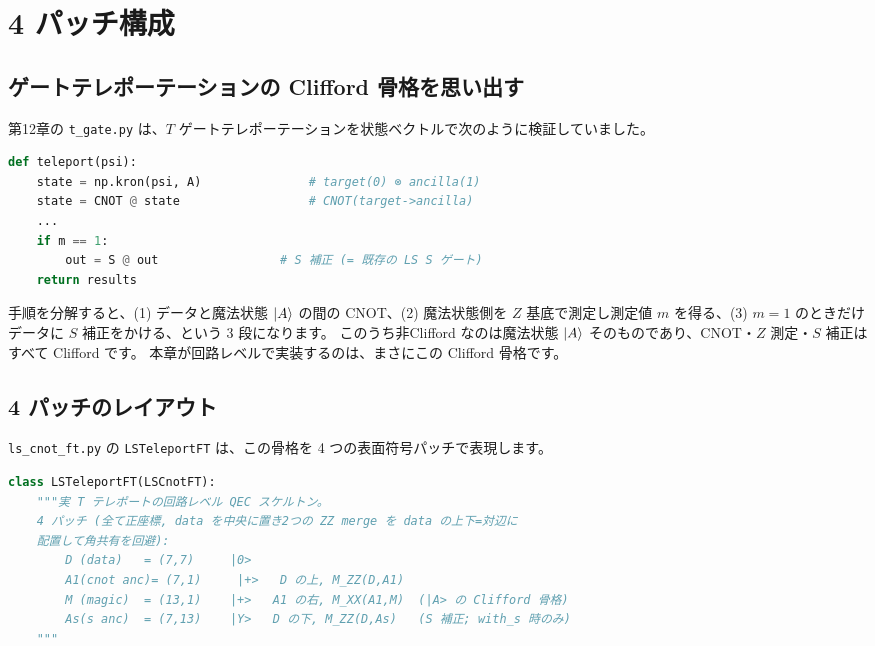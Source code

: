 \section{4 パッチ構成}\label{sec:four_patch}

\subsection{ゲートテレポーテーションの Clifford 骨格を思い出す}

第12章の \texttt{t\_gate.py} は、$T$ ゲートテレポーテーションを状態ベクトルで次のように検証していました。

\begin{lstlisting}[language=Python, caption={T ゲートテレポーテーションの手順（\codepath{src/stages/02_circuit_level/src/ftqc/t_gate.py}）}]
def teleport(psi):
    state = np.kron(psi, A)               # target(0) ⊗ ancilla(1)
    state = CNOT @ state                  # CNOT(target->ancilla)
    ...
    if m == 1:
        out = S @ out                 # S 補正 (= 既存の LS S ゲート)
    return results
\end{lstlisting}

手順を分解すると、(1) データと魔法状態 $\ket{A}$ の間の CNOT、(2) 魔法状態側を $Z$ 基底で測定し測定値 $m$ を得る、(3) $m=1$ のときだけデータに $S$ 補正をかける、という 3 段になります。
このうち非Clifford なのは魔法状態 $\ket{A}$ そのものであり、CNOT・$Z$ 測定・$S$ 補正はすべて Clifford です。
本章が回路レベルで実装するのは、まさにこの Clifford 骨格です。

\subsection{4 パッチのレイアウト}

\texttt{ls\_cnot\_ft.py} の \texttt{LSTeleportFT} は、この骨格を 4 つの表面符号パッチで表現します。

\begin{lstlisting}[language=Python, caption={LSTeleportFT の 4 パッチ構成（\codepath{src/stages/02_circuit_level/src/ftqc/ls_cnot_ft.py}）}]
class LSTeleportFT(LSCnotFT):
    """実 T テレポートの回路レベル QEC スケルトン。
    4 パッチ (全て正座標, data を中央に置き2つの ZZ merge を data の上下=対辺に
    配置して角共有を回避):
        D (data)   = (7,7)     |0>
        A1(cnot anc)= (7,1)     |+>   D の上, M_ZZ(D,A1)
        M (magic)  = (13,1)    |+>   A1 の右, M_XX(A1,M)  (|A> の Clifford 骨格)
        As(s anc)  = (7,13)    |Y>   D の下, M_ZZ(D,As)   (S 補正; with_s 時のみ)
    """
\end{lstlisting}


